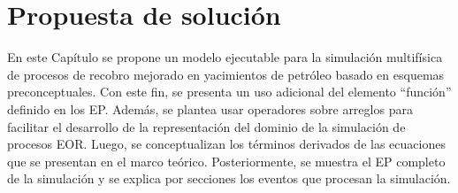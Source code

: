 \chapter{Propuesta de solución}\label{cap:Solucion}
En este Capítulo se propone un modelo ejecutable para la simulación multifísica de procesos de recobro mejorado en yacimientos de petróleo basado en esquemas preconceptuales. Con este fin, se presenta un uso adicional del elemento ``función'' definido en los EP. Además, se plantea usar operadores sobre arreglos para facilitar el desarrollo de la representación del dominio de la simulación de procesos EOR. Luego, se conceptualizan los términos derivados de las ecuaciones que se presentan en el marco teórico. Posteriormente, se muestra el EP completo de la simulación y se explica por secciones los eventos que procesan la simulación.




